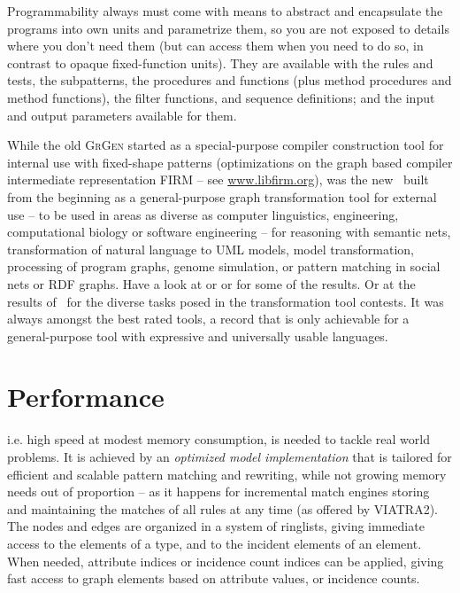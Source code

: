Programmability always must come with means to abstract and encapsulate the programs into own units and parametrize them, so you are not exposed to details where you don't need them (but can access them when you need to do so, in contrast to opaque fixed-function units).
They are available with the rules and tests, the subpatterns, the procedures and functions (plus method procedures and method functions), the filter functions, and sequence definitions; and the input and output parameters available for them.

While the old \textsc{GrGen} started as a special-purpose compiler construction tool for internal use with fixed-shape patterns 
(optimizations on the graph based compiler intermediate representation FIRM -- see \url{www.libfirm.org}),
was the new \GrG\ built from the beginning as a general-purpose graph transformation tool for external use
-- to be used in areas as diverse as computer linguistics, engineering, computational biology or software engineering --
for reasoning with semantic nets, transformation of natural language to UML models,
model transformation, processing of program graphs, genome simulation, or pattern matching in social nets or RDF graphs.
Have a look at \cite{usecomputerlinguistics} or \cite{usemodeltransformation} or \cite{usegeneexpression} for some of the results.
Or at the results of \GrG\ for the diverse tasks posed in the transformation tool contests. 
It was always amongst the best rated tools, a record that is only achievable for a general-purpose tool with expressive and universally usable languages.

\section{Performance}
i.e. high speed at modest memory consumption, is needed to tackle real world problems.
It is achieved by an \emph{optimized model implementation} that is tailored for efficient and scalable pattern matching and rewriting,
while not growing memory needs out of proportion -- as it happens for incremental match engines storing and maintaining the matches of all rules at any time (as offered by VIATRA2\cite{viatra2}).
The nodes and edges are organized in a system of ringlists, giving immediate access to the elements of a type, and to the incident elements of an element.
When needed, attribute indices or incidence count indices can be applied, giving fast access to graph elements based on attribute values, or incidence counts.

